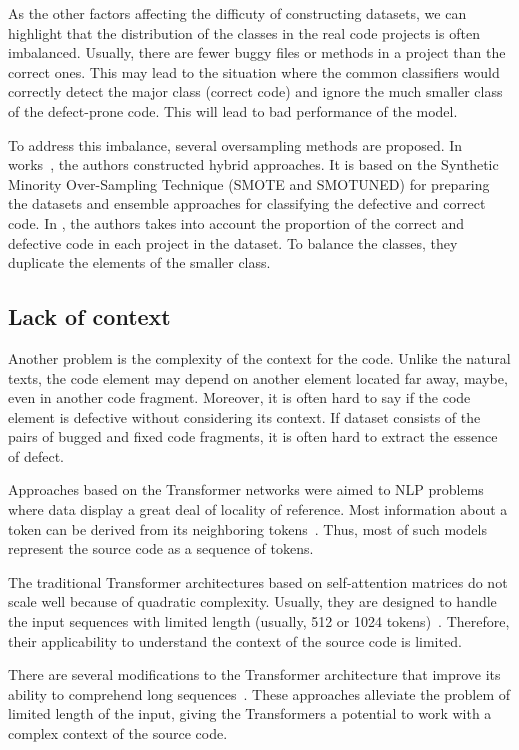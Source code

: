 \documentclass[mathematics,review,submit,moreauthors,pdftex]{Definitions/mdpi}
\begin{document}
As the other factors affecting the difficuty of constructing datasets, we can highlight that the distribution of the classes in the real code projects is often imbalanced. Usually, there are fewer buggy files or methods in a project than the correct ones. This may lead to the situation where the common classifiers would correctly detect the major class (correct code) and ignore the much smaller class of the defect-prone code.
This will lead to bad performance of the model.

To address this imbalance, several oversampling methods are proposed. In works~\cite{AlsawalqahEtAl2017,AgrawalMenzies2018}, the authors constructed hybrid approaches. It is based on the Synthetic Minority Over-Sampling Technique (SMOTE and SMOTUNED) for preparing the datasets and ensemble approaches for classifying the defective and correct code.
In \cite{ShiEtAl2020}, the authors takes into account the proportion of the correct and defective code in each project in the dataset. To balance the classes, they duplicate the elements of the smaller class.

\subsection{Lack of context}

Another problem is the complexity of the context for the code. Unlike the natural texts, the code element may depend on another element located far away, maybe, even in another code fragment. Moreover, it is often hard to say if the code element is defective without considering its context. If dataset consists of the pairs of bugged and fixed code fragments, it is often hard to extract the essence of defect.

Approaches based on the Transformer networks were aimed to NLP problems where data display a great deal of locality of reference. Most information about a token can be derived from its neighboring tokens~\cite{ tay2020efficient}. Thus, most of such models represent the source code as a sequence of tokens.

The traditional Transformer architectures based on self-attention matrices do not scale well because of quadratic complexity. Usually, they are designed to handle the input sequences with limited length (usually, 512 or 1024 tokens)~\cite{tay2020efficient, tay2020long}.
 Therefore, their applicability to understand the context of the source code is limited.
 
There are several modifications to the Transformer architecture that improve its ability to comprehend long sequences~\cite{zaheer2021big,fiok2021text,beltagy2020longformer}. These approaches alleviate the problem of limited length of the input, giving the Transformers a potential to work with a complex context of the source code. 
 
\end{document}
